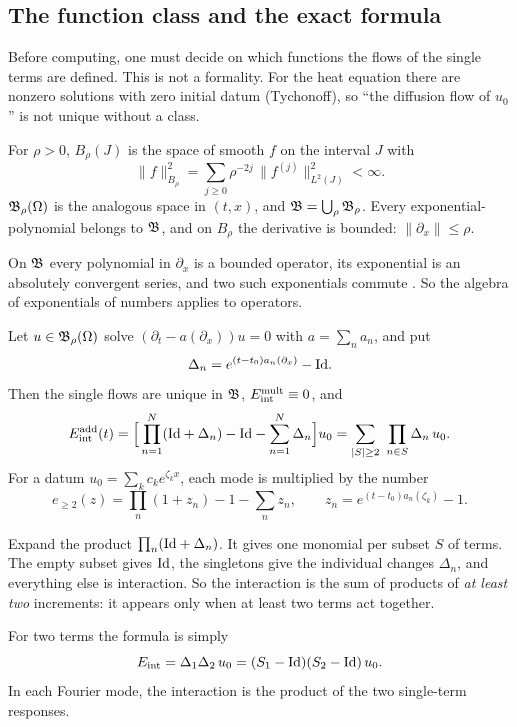 \subsection{The function class and the exact formula}

Before computing, one must decide on which functions the flows of the single terms are defined. This is not a formality. For the heat equation there are nonzero solutions with zero initial datum (Tychonoff), so ``the diffusion flow of $u_0$'' is not unique without a class.

\begin{definition}\label{def:B}
For $\rho>0$, $B_\rho(J)$ is the space of smooth $f$ on the interval $J$ with
\[
\|f\|_{B_\rho}^2=\sum_{j\ge0}\rho^{-2j}\,\|f^{(j)}\|_{L^2(J)}^2<\infty .
\]
$\mathfrak{B}_\rho(\Omega)$ is the analogous space in $(t,x)$, and $\mathfrak{B}=\bigcup_\rho\mathfrak{B}_\rho$. Every exponential-polynomial belongs to $\mathfrak{B}$, and on $B_\rho$ the derivative is bounded: $\|\partial_x\|\le\rho$.
\end{definition}

On $\mathfrak{B}$ every polynomial in $\partial_x$ is a bounded operator, its exponential is an absolutely convergent series, and two such exponentials commute  \proved. So the algebra of exponentials of numbers applies to operators.

\begin{theorem}\label{f:thm:eint}
Let $u\in\mathfrak{B}_\rho(\Omega)$ solve $(\partial_t-a(\partial_x))u=0$ with $a=\sum_na_n$, and put
\[
\Delta_n=e^{(t-t_0)a_n(\partial_x)}-\mathrm{Id} .
\]
Then the single flows are unique in $\mathfrak{B}$, $E_{\mathrm{int}}^{\mathrm{mult}}\equiv0$, and
\begin{equation}\label{f:eq:eint}
E_{\mathrm{int}}^{\mathrm{add}}(t)=\Big[\prod_{n=1}^N(\mathrm{Id}+\Delta_n)-\mathrm{Id}-\sum_{n=1}^N\Delta_n\Big]u_0
=\sum_{|S|\ge2}\ \prod_{n\in S}\Delta_n\,u_0 .
\end{equation}
For a datum $u_0=\sum_kc_ke^{\zeta_kx}$, each mode is multiplied by the number
\[
e_{\ge2}(z)=\prod_n(1+z_n)-1-\sum_nz_n,\qquad z_n=e^{(t-t_0)a_n(\zeta_k)}-1 .
\]
\end{theorem}

\begin{intuition}
Expand the product $\prod_n(\mathrm{Id}+\Delta_n)$. It gives one monomial per subset $S$ of terms. The empty subset gives $\mathrm{Id}$, the singletons give the individual changes $\Delta_n$, and everything else is interaction. So the interaction is the sum of products of \emph{at least two} increments: it appears only when at least two terms act together.

For two terms the formula is simply
\[
E_{\mathrm{int}}=\Delta_1\Delta_2\,u_0=(S_1-\mathrm{Id})(S_2-\mathrm{Id})\,u_0 .
\]
In each Fourier mode, the interaction is the product of the two single-term responses.
\end{intuition}


